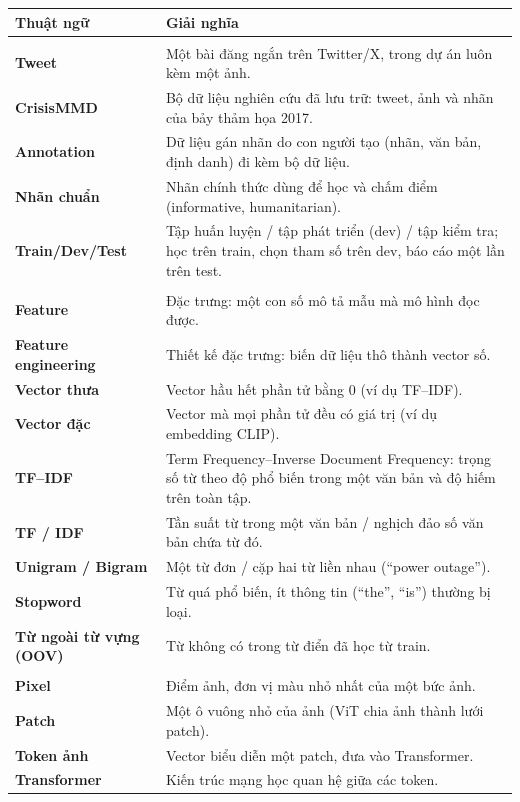 \begin{longtable}{>{\bfseries}p{3.4cm}p{10.8cm}}
\toprule
\textmd{\bfseries Thuật ngữ} & \textbf{Giải nghĩa}\\
\midrule
\endhead
\multicolumn{2}{l}{\textit{\textbf{Dữ liệu và bài toán}}}\\
Tweet & Một bài đăng ngắn trên Twitter/X, trong dự án luôn kèm một ảnh.\\
CrisisMMD & Bộ dữ liệu nghiên cứu đã lưu trữ: tweet, ảnh và nhãn của bảy thảm
họa 2017.\\
Annotation & Dữ liệu gán nhãn do con người tạo (nhãn, văn bản, định danh) đi
kèm bộ dữ liệu.\\
Nhãn chuẩn & Nhãn chính thức dùng để học và chấm điểm (informative, humanitarian).\\
Train/Dev/Test & Tập huấn luyện / tập phát triển (dev) / tập kiểm tra; học trên
train, chọn tham số trên dev, báo cáo một lần trên test.\\
\midrule
\multicolumn{2}{l}{\textit{\textbf{Đặc trưng văn bản}}}\\
Feature & Đặc trưng: một con số mô tả mẫu mà mô hình đọc được.\\
Feature engineering & Thiết kế đặc trưng: biến dữ liệu thô thành vector số.\\
Vector thưa & Vector hầu hết phần tử bằng 0 (ví dụ TF--IDF).\\
Vector đặc & Vector mà mọi phần tử đều có giá trị (ví dụ embedding CLIP).\\
TF--IDF & Term Frequency--Inverse Document Frequency: trọng số từ theo độ phổ
biến trong một văn bản và độ hiếm trên toàn tập.\\
TF / IDF & Tần suất từ trong một văn bản / nghịch đảo số văn bản chứa từ đó.\\
Unigram / Bigram & Một từ đơn / cặp hai từ liền nhau (``power outage'').\\
Stopword & Từ quá phổ biến, ít thông tin (``the'', ``is'') thường bị loại.\\
Từ ngoài từ vựng (OOV) & Từ không có trong từ điển đã học từ train.\\
\midrule
\multicolumn{2}{l}{\textit{\textbf{Đặc trưng ảnh}}}\\
Pixel & Điểm ảnh, đơn vị màu nhỏ nhất của một bức ảnh.\\
Patch & Một ô vuông nhỏ của ảnh (ViT chia ảnh thành lưới patch).\\
Token ảnh & Vector biểu diễn một patch, đưa vào Transformer.\\
Transformer & Kiến trúc mạng học quan hệ giữa các token.\\

\end{longtable}
